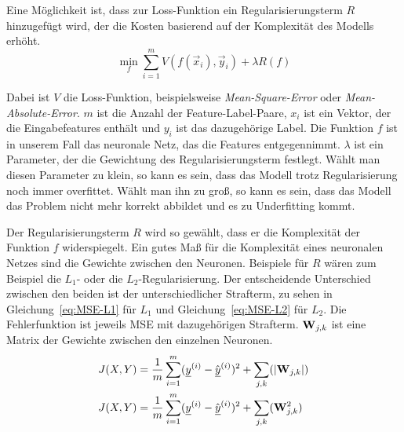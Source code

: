 Eine Möglichkeit ist, dass zur Loss-Funktion ein Regularisierungsterm \(R\) hinzugefügt wird, 
der die Kosten basierend auf der Komplexität des Modells erhöht.
%  
\begin{equation}
	\min_f \sum\limits_{i=1}^{m} V(f(\vec{x}_i), \vec{y}_i) + \lambda R(f)
\end{equation} 
 
Dabei ist \(V\) die Loss-Funktion, beispielsweise \textit{Mean-Square-Error} oder \textit{Mean-Absolute-Error}.
\(m\) ist die Anzahl der Feature-Label-Paare,
\(x_i\) ist ein Vektor, der die Eingabefeatures enthält und \(y_i\) ist das dazugehörige Label.
Die Funktion \(f\) ist in unserem Fall das neuronale Netz, das die Features entgegennimmt.
\(\lambda\) ist ein Parameter, der die Gewichtung des Regularisierungsterm festlegt.
Wählt man diesen Parameter zu klein, so kann es sein, dass das Modell trotz Regularisierung noch immer overfittet.
Wählt man ihn zu groß, so kann es sein, dass das Modell das Problem nicht mehr korrekt abbildet und es zu Underfitting kommt.

Der Regularisierungsterm \(R\) wird so gewählt, dass er die Komplexität der Funktion \(f\) widerspiegelt.
Ein gutes Maß für die Komplexität eines neuronalen Netzes sind die Gewichte zwischen den Neuronen.
Beispiele für \(R\) wären zum Beispiel die \(L_1\)- oder die \(L_2\)-Regularisierung. %
Der entscheidende Unterschied zwischen den beiden ist der unterschiedlicher Strafterm, zu sehen in Gleichung~\eqref{eq:MSE-L1} für \(L_1\) und Gleichung~\eqref{eq:MSE-L2} für \(L_2\). 
Die Fehlerfunktion ist jeweils MSE mit dazugehörigen Strafterm. \({{\mathbf{W}}}_{j,k}\) ist eine Matrix der Gewichte zwischen den einzelnen Neuronen. 
% 
\begin{align}
	J(X, Y) &= \frac{1}{m} \sum_{i=1}^{m} ({\underline{y}}^{(i)} - \hat{{\underline{y}}}^{(i)})^2 + \sum_{j, k} (|{{\mathbf{W}}}_{j,k}|) \label{eq:MSE-L1} \\
	J(X, Y) &= \frac{1}{m} \sum_{i=1}^{m} ({\underline{y}}^{(i)} - \hat{{\underline{y}}}^{(i)})^2 + \sum_{j, k} ({{\mathbf{W}}}_{j,k}^2) \label{eq:MSE-L2}
\end{align}
% 



